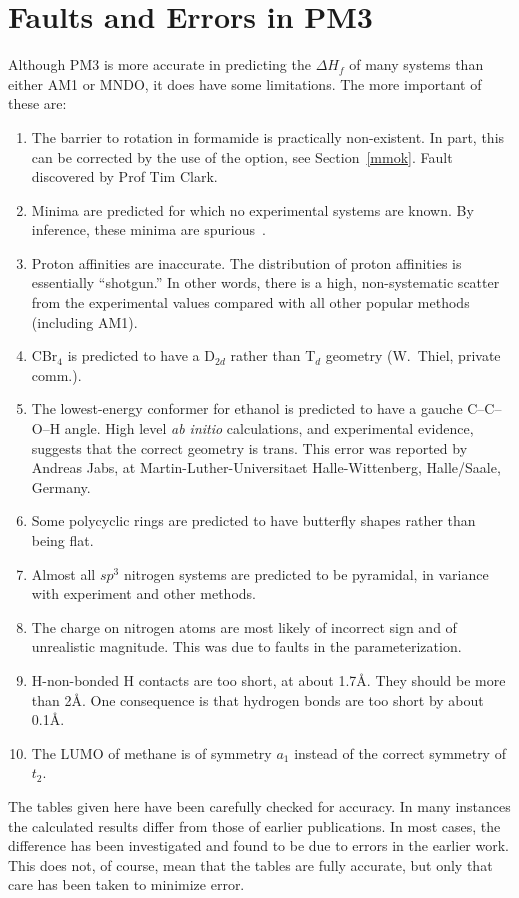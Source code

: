 \section{Faults and Errors in PM3}
Although PM3 is more accurate in predicting the $\Delta H_f$ of many systems
than either AM1 or MNDO, it does have some limitations. The more important of
these are:

\begin{enumerate}
\item The barrier to rotation in formamide is practically non-existent. In
part, this can be corrected by the use of the  option, see
Section~\ref{mmok}. Fault discovered by Prof Tim Clark.
\item Minima are predicted for which no experimental systems are known.  By
inference, these minima are spurious~\cite{klebe}.
\item Proton affinities are inaccurate.  The distribution of proton affinities
is essentially ``shotgun.''  In other words, there is a high, non-systematic
scatter from the experimental values compared with all other popular
methods~\cite{schmiedekamp} (including AM1).
\item CBr$_4$ is predicted to have a D$_{2d}$ rather than T$_d$ geometry (W.\
Thiel, private comm.).
\item The lowest-energy conformer for ethanol is predicted to have a gauche
C--C--O--H angle.  High level {\em ab initio} calculations, and experimental
evidence, suggests that the correct geometry is trans.  This error was reported
by Andreas Jabs, at Martin-Luther-Universitaet Halle-Wittenberg, Halle/Saale,
Germany.
\item Some polycyclic rings are predicted to have butterfly shapes rather than
being flat.  
\item Almost all $sp^3$ nitrogen systems are predicted to be pyramidal, in
variance with experiment and other methods.
\item The charge on nitrogen atoms are most likely of incorrect sign  and of
unrealistic magnitude. This was due to faults in the parameterization.
\item H-non-bonded H contacts are too short, at about 1.7\AA . They should be
more than 2\AA .  One consequence is that hydrogen bonds are too short by about
0.1\AA .
\item The LUMO of methane is of symmetry $a_1$ instead of the correct symmetry 
of $t_2$. 
\end{enumerate}

The tables given here have been carefully checked for accuracy. In many
instances the calculated results differ from those of earlier publications. In
most cases, the difference has been investigated and found to be due to errors
in the earlier work. This does not, of course, mean that the tables are fully
accurate, but only that care has been taken to minimize error.

